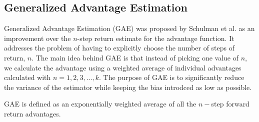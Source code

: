 \subsection{Generalized Advantage Estimation}
Generalized Advantage Estimation (GAE) was proposed by Schulman et al. as an improvement over the $n$-step return estimate for the advantage function. 
It addresses the problem of having to explicitly choose the number of steps of return, $n$.
The main idea behind GAE is that instead of picking one value of $n$, we calculate the advantage using a weighted average of individual advantages calculated with $n=1,2,3, \dots , k$. 
The purpose of GAE is to significantly reduce the variance of the estimator while keeping the bias introdced as low as possible. 

GAE is defined as an exponentially weighted average of all the $n-$step forward return advantages. 